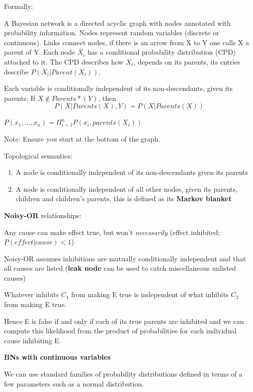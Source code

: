 \documentclass{article}
\begin{document}
Formally:

A Bayesian network is a directed acyclic graph with nodes annotated with probability information. Nodes represent random variables (discrete or continuous). Links connect nodes, if there is an arrow from X to Y one calls X a parent of Y. Each node $X_i$ has a conditional probability distribution (CPD) attached to it. The CPD describes how $X_i$, depends on its parents, its entries describe $P(X_i | Parent(X_i))$. \newline

Each variable is conditionally independent of its non-descendants, given its parents: If $X \notin Parents*(Y)$, then $$P(X| Parents(X),Y) = P(X | Parents(X))$$ \newline

$P(x_1, \ldots, x_n) = \Pi_{i=1}^n P(x_i, parents(X_i))$

Note: Ensure you start at the bottom of the graph. \newline

Topological semantics:
\begin{enumerate}
    \item A node is conditionally independent of its non-descendants given its parents
    \item A node is conditionally independent of all other nodes, given its parents, children and children's parents, this is defined as its \textbf{Markov blanket}
\end{enumerate}

\textbf{Noisy-OR} relationships: \newline

Any cause can make effect true, but won't \textit{necessarily} (effect inhibited; $P(effect | cause) < 1$)

Noisy-OR assumes inhibitions are mutually conditionally independent and that all causes are listed (\textbf{leak node} can be used to catch miscellaneous unlisted causes)

Whatever inhibits $C_1$ from making E true is independent of what inhibits $C_2$ from making E true.

Hence E is false if and only if each of its true parents are inhibited and we can compute this likelihood from the product of probabilities for each individual cause inhibiting E. \newline

\textbf{BNs with continuous variables} \newline

We can use standard families of probability distributions defined in terms of a few parameters such as a normal distribution. 
\end{document}
